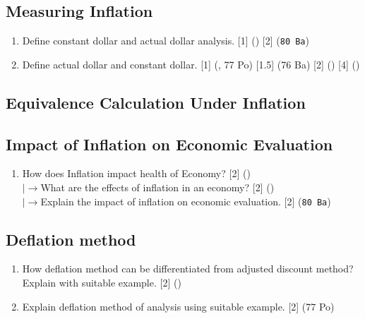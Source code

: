 \documentclass[12pt]{article}
\newcommand{\lb}{\\ $\left|\rightarrow\right.$}
\begin{document}
	\subsection{Measuring Inflation}
		\begin{enumerate}[noitemsep, topsep=0pt]
			\item Define constant dollar and actual dollar analysis. \hfill [1] () [2] (\texttt{80 Ba})

			\item Define actual dollar and constant dollar. \hfill [1] (, 77 Po) [1.5] (76 Ba) [2] () [4] ()
		\end{enumerate}

	\subsection{Equivalence Calculation Under Inflation}

	\subsection{Impact of Inflation on Economic Evaluation}
		\begin{enumerate}[noitemsep, topsep=0pt]
			\item How does Inflation impact health of Economy? \hfill [2] ()
			\lb What are the effects of inflation in an economy? \hfill [2] ()
			\lb Explain the impact of inflation on economic evaluation. \hfill [2] (\texttt{80 Ba})
		\end{enumerate}

	\subsection{Deflation method}
		\begin{enumerate}[noitemsep, topsep=0pt]
			\item How deflation method can be differentiated from adjusted discount method? Explain with suitable example. \hfill [2] ()

			\item Explain deflation method of analysis using suitable example. \hfill [2] (77 Po)
		\end{enumerate}
\end{document}
